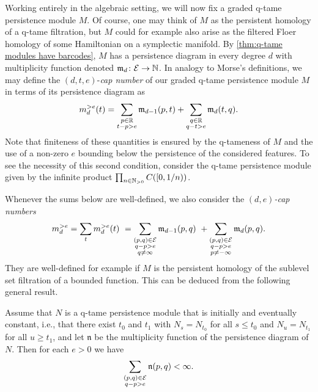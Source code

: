 Working entirely in the algebraic setting, we will now fix a graded q-tame persistence module $M$.
Of course, one may think of $M$ as the persistent homology of a q-tame filtration, but $M$ could for example also arise as the filtered Floer homology of some Hamiltonian on a symplectic manifold.
By \cref{thm:q-tame modules have barcodes}, $M$ has a persistence diagram in every degree $d$ with multiplicity function denoted $\mathfrak{m}_d \colon \mathcal{E} \to \mathbb{N}$.
In analogy to Morse's definitions, we may define the $(d, t, e)$-\textit{cap number} of our graded q-tame persistence module $M$ in terms of its persistence diagram as
\begin{equation*}
m_{d}^{> e}(t) =
\sum_{\substack{p \in \mathbb{R} \\ t - p > e}} \mathfrak{m}_{d-1}(p, t) +
\sum_{\substack{q \in \mathbb{R} \\ q - t > e}} \mathfrak{m}_d(t, q).
\end{equation*}
Note that finiteness of these quantities is ensured by the q-tameness of $M$ and the use of a non-zero $e$ bounding below the persistence of the considered features.
To see the necessity of this second condition, consider the q-tame persistence module given by the infinite product $\prod_{n \in \mathbb{N}_{> 0}} C([0,1/n))$.

Whenever the sums below are well-defined, we also consider the \emph{$(d,e)$-cap numbers} 
\begin{equation} \label{e:cap numbers}
m_{d}^{> e } =
\sum_{t} m_{d}^{> e}(t) \ =
\sum_{\substack{(p,q) \in \mathcal{E} \\ q - p > e \\ q \neq \infty}} \mathfrak{m}_{d-1}(p,q) \ +
\sum_{\substack{(p,q) \in \mathcal{E} \\ q - p > e \\ p \neq -\infty}}\mathfrak{m}_d(p,q).
\end{equation} 
They are well-defined for example if $M$ is the persistent homology of the sublevel set filtration of a bounded function.
This can be deduced from the following general result.

\begin{thm}
    Assume that $N$ is a q-tame persistence module that is initially and eventually constant, i.e., that there exist $t_0$ and $t_1$ with $N_s = N_{t_0}$ for all $s \leq t_0$ and $N_u = N_{t_1}$ for all $u \geq t_1$, and let $\mathfrak{n}$ be the multiplicity function of the persistence diagram of $N$.
    Then for each $e>0$ we have 
    \begin{equation*}
    \sum_{ \substack{ (p,q) \in \mathcal{E} \\ q-p > e } } \mathfrak{n} (p,q) < \infty.
    \end{equation*}
\end{thm}

